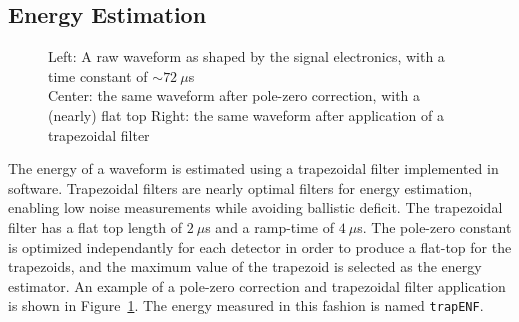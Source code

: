 \documentclass[/main.tex]{subfiles}
\begin{document}
\subsection{Energy Estimation}
\begin{figure}
  \centering
  \caption[Pole-zero correction and trapezoidal filter]{\label{fig:trapfilter}
    Left: A raw waveform as shaped by the signal electronics, with a time constant of $\sim72~\mu$s\\
    Center: the same waveform after pole-zero correction, with a (nearly) flat top
    Right: the same waveform after application of a trapezoidal filter
  }
\end{figure}
The energy of a waveform is estimated using a trapezoidal filter implemented in software.
Trapezoidal filters are nearly optimal filters for energy estimation, enabling low noise measurements while avoiding ballistic deficit\cite{Radeka1972, knoll}.
The trapezoidal filter has a flat top length of $2~\mu$s and a ramp-time of $4~\mu$s.
The pole-zero constant is optimized independantly for each detector in order to produce a flat-top for the trapezoids, and the maximum value of the trapezoid is selected as the energy estimator.
An example of a pole-zero correction and trapezoidal filter application is shown in Figure~\ref{fig:trapfilter}.
The energy measured in this fashion is named \texttt{trapENF}.
\end{document}
